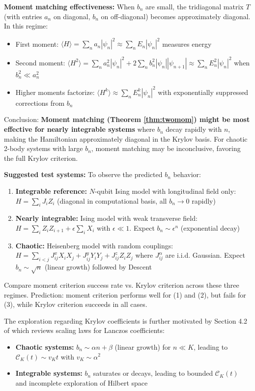 \documentclass[ a4paper, 
                amsfonts, 
                amssymb, 
                amsmath, 
                reprint, 
                showkeys, 
                nofootinbib,
                superscriptaddress, 
                onecolumn, 
                notitlepage,
                aps,
                pra,
                longbibliography]{revtex4-1}
\theoremstyle{definition}
\begin{document}
\textbf{Moment matching effectiveness:} When $b_n$ are small, the tridiagonal matrix $T$ (with entries $a_n$ on diagonal, $b_n$ on off-diagonal) becomes approximately diagonal. In this regime:
\begin{itemize}
\item First moment: $\langle H \rangle = \sum_n a_n |\psi_n|^2 \approx \sum_n E_n |\psi_n|^2$  measures energy
\item Second moment: $\langle H^2 \rangle = \sum_n a_n^2 |\psi_n|^2 + 2\sum_n b_n^2 |\psi_n||\psi_{n+1}| \approx \sum_n E_n^2 |\psi_n|^2$ when $b_n^2 \ll a_n^2$
\item Higher moments factorize: $\langle H^k \rangle \approx \sum_n E_n^k |\psi_n|^2$ with exponentially suppressed corrections from $b_n$
\end{itemize}

Conclusion: \textbf{Moment matching (Theorem \ref{thm:twomom}) might be most effective for nearly integrable systems} where $b_n$ decay rapidly with $n$, making the Hamiltonian approximately diagonal in the Krylov basis. For chaotic 2-body systems with large $b_n$, moment matching may be inconclusive, favoring the full Krylov criterion.

\textbf{Suggested test systems:} To observe the predicted $b_n$ behavior:
\begin{enumerate}
\item \textbf{Integrable reference:} $N$-qubit Ising model with longitudinal field only: $H = \sum_i J_i Z_i$ (diagonal in computational basis, all $b_n \to 0$ rapidly)
\item \textbf{Nearly integrable:} Ising model with weak transverse field: $H = \sum_i Z_i Z_{i+1} + \epsilon \sum_i X_i$ with $\epsilon \ll 1$. Expect $b_n \sim \epsilon^n$ (exponential decay)
\item \textbf{Chaotic:} Heisenberg model with random couplings: $H = \sum_{i<j} J_{ij}^x X_i X_j + J_{ij}^y Y_i Y_j + J_{ij}^z Z_i Z_j$ where $J_{ij}^\alpha$ are i.i.d. Gaussian. Expect $b_n \sim \sqrt{n}$ (linear growth) followed by Descent
\end{enumerate}

Compare moment criterion success rate vs. Krylov criterion across these three regimes. Prediction: moment criterion performs well for (1) and (2), but fails for (3), while Krylov criterion succeeds in all cases.


The exploration regarding Krylov coefficients is further motivated by Section 4.2 of \cite{nandy_krylov_review} which reviews scaling laws for Lanczos coefficients:
\begin{itemize}
\item \textbf{Chaotic systems:} $b_n \sim \alpha n + \beta$ (linear growth) for $n \ll K$, leading to $\mathcal{C}_K(t) \sim v_K t$ with $v_K \sim \alpha^2$
\item \textbf{Integrable systems:} $b_n$ saturates or decays, leading to bounded $\mathcal{C}_K(t)$ and incomplete exploration of Hilbert space
\end{itemize}
\end{document}
